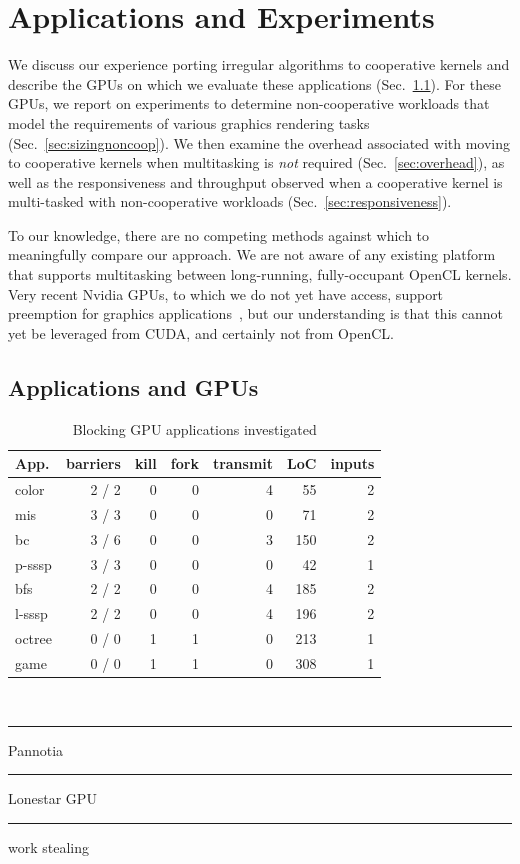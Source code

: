 \documentclass[parskip=half,sigconf,review, anonymous=true, acmcopyrightmode=none]{acmart}
\newcommand\crule[3][black]{\textcolor{#1}{\rule{#2}{#3}}}
\newcommand{\mysec}{Sec.~}
\newcommand{\nvidia}{Nvidia\xspace}
\begin{document}
\section{Applications and Experiments}\label{sec:experiments}

We discuss our experience porting irregular algorithms to cooperative
kernels and describe the GPUs on which we evaluate these applications
(\mysec\ref{sec:portingalgorithms}).  For these GPUs, we report on
experiments to determine non-cooperative workloads that model the
requirements of various graphics rendering tasks
(\mysec\ref{sec:sizingnoncoop}).  We then examine the overhead
associated with moving to cooperative kernels when multitasking is
\emph{not} required (\mysec\ref{sec:overhead}), as well as the
responsiveness and throughput observed when a cooperative kernel is
multi-tasked with non-cooperative workloads
(\mysec\ref{sec:responsiveness}).

To our knowledge, there are no competing methods against which to
meaningfully compare our approach.  We are not aware of any existing
platform that supports multitasking between long-running, fully-occupant
OpenCL kernels.  Very recent \nvidia{} GPUs, to which we do not yet have
access, support preemption for graphics
applications~\cite{PascalWhitepaper}, but our understanding is that this
cannot yet be leveraged from CUDA, and certainly not from OpenCL.


\subsection{Applications and GPUs}\label{sec:portingalgorithms}

\begin{table}[t]
\normalsize
\centering
\begin{tabular}{ l r r r r r r}
App. & barriers & kill & fork & transmit & LoC & inputs\\
\hline
\rowcolor{Gray1}
color & 2 / 2 & 0 & 0 & 4 & 55 & 2\\
\rowcolor{Gray1}
mis & 3 / 3 & 0 & 0 & 0 & 71 & 2\\
\rowcolor{Gray1}
bc & 3 / 6 & 0 & 0 & 3 & 150 & 2\\
\rowcolor{Gray1}
p-sssp & 3 / 3 & 0 & 0 & 0  & 42 & 1\\
\rowcolor{Gray2}
bfs & 2 / 2 & 0 & 0  & 4  & 185 & 2\\
\rowcolor{Gray2}
l-sssp & 2 / 2 & 0 & 0  & 4  & 196 & 2\\
\rowcolor{Gray3}
octree & 0 / 0 & 1 & 1 & 0 & 213 & 1 \\
\rowcolor{Gray3}
game & 0 / 0 & 1 & 1 & 0 & 308 & 1 \\
\end{tabular} \\
\crule[Gray1]{.2cm}{.2cm} Pannotia \hspace{.4cm} \crule[Gray2]{.2cm}{.2cm} Lonestar GPU  \hspace{.4cm}  \crule[Gray3]{.2cm}{.2cm} work stealing
\caption{Blocking GPU applications investigated}
\label{tab:applications}
\vspace{-8mm}
\end{table}
\end{document}
